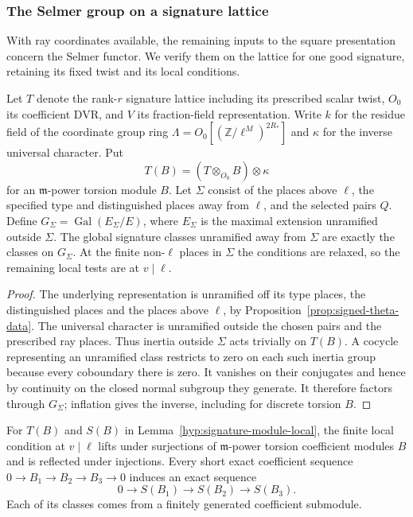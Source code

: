 \subsubsection*{The Selmer group on a signature lattice}
\label{subsec:signature-selmer}

With ray coordinates available, the remaining inputs to the square presentation concern the Selmer functor. We verify them on the lattice for one good signature, retaining its fixed twist and its local conditions.

\begin{established}\label{hyp:signature-module-local}
Let \(T\) denote the rank-\(r\) signature lattice including its
prescribed scalar twist, \(O_0\) its coefficient DVR, and \(V\)
its fraction-field representation. Write \(k\) for the residue
field of the coordinate group ring \(\Lambda=O_0[(\mathbb Z/\ell^M)^{2R_*}]\) and \(\kappa\) for
the inverse universal character. Put
\[
 T(B)=(T\otimes_{O_0}B)\otimes\kappa
\]
for an
\(\mathfrak m\)-power torsion module \(B\). Let
\(\Sigma\) consist of the places above \(\ell\), the specified
type and distinguished places away from \(\ell\), and the
selected pairs \(Q\). Define \(G_\Sigma=\operatorname{Gal}(E_\Sigma/E)\), where \(E_\Sigma\) is the maximal extension unramified outside \(\Sigma\). The global signature classes unramified away from \(\Sigma\) are exactly the classes on \(G_\Sigma\). At the finite non-\(\ell\) places in \(\Sigma\) the conditions are relaxed, so the remaining local tests are at \(v\mid\ell\).
\end{established}
\begin{proof}
The underlying representation is unramified off its type places, the distinguished places and the places above \(\ell\), by Proposition~\ref{prop:signed-theta-data}. The universal character is unramified outside the chosen pairs and the prescribed ray places. Thus inertia outside \(\Sigma\) acts trivially on \(T(B)\). A cocycle representing an unramified class restricts to zero on each such inertia group because every coboundary there is zero. It vanishes on their conjugates and hence by continuity on the closed normal subgroup they generate. It therefore factors through \(G_\Sigma\); inflation gives the inverse, including for discrete torsion \(B\).
\end{proof}

\begin{lemma}\label{lem:signature-left-exact}
For \(T(B)\) and \(S(B)\) in Lemma~\ref{hyp:signature-module-local},
the finite local condition at \(v\mid\ell\) lifts under
surjections of \(\mathfrak m\)-power torsion coefficient
modules \(B\) and is reflected under injections. Every short exact coefficient sequence \(0\to B_1\to B_2\to B_3\to0\) induces an exact sequence
\[
 0\longrightarrow S(B_1)\longrightarrow S(B_2)\longrightarrow S(B_3).
\] Each of its classes comes from a
finitely generated coefficient submodule.
\end{lemma}

